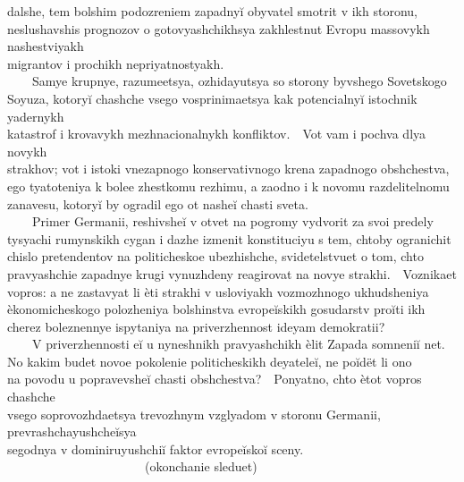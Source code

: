 {dal{\cprime}she, tem bol{\cprime}shim podozreniem zapadny{\u i} obyvatel{\cprime} smotrit v ikh storonu,\\
neslushavshis{\cprime} prognozov o gotovyashchikhsya zakhlestnut{\cprime} Evropu massovykh nashestviyakh\\
migrantov i prochikh nepriyatnostyakh.\\
{\ \ }{\ \ }Samye krupnye, razumeet{\cydot}sya, ozhidayut{\cydot}sya so storony byvshego Sovet{\cydot}skogo\\
Soyuza, kotory{\u i} chashche vsego vosprinimaet{\cydot}sya kak potencial{\cprime}ny{\u i} istochnik yadernykh\\
katastrof i krovavykh mezhnacional{\cprime}nykh konfliktov.{\ \ }Vot vam i pochva dlya novykh\\
strakhov; vot i istoki vnezapnogo konservativnogo krena zapadnogo obshchestva,\\
ego tyatoteniya k bolee zhestkomu rezhimu, a zaodno i k novomu razdelitel{\cprime}nomu\\
zanavesu, kotory{\u i} by ogradil ego ot nashe{\u i} chasti sveta.\\
{\ \ }{\ \ }Primer Germanii, reshivshe{\u i} v otvet na pogromy vydvorit{\cprime} za svoi predely\\
tysyachi rumynskikh cygan i dazhe izmenit{\cprime} konstituciyu s tem, chtoby ogranichit{\cprime}\\
chislo pretendentov na politicheskoe ubezhishche, svidetel{\cprime}stvuet o tom, chto\\
pravyashchie zapadnye krugi vynuzhdeny reagirovat{\cprime} na novye strakhi.{\ \ }Voznikaet\\
vopros: a ne zastavyat li \`eti strakhi v usloviyakh vozmozhnogo ukhudsheniya\\
\`ekonomicheskogo polozheniya bol{\cprime}shinstva evrope{\u i}skikh gosudarstv pro{\u i}ti ikh\\
cherez boleznennye ispytaniya na priverzhennost{\cprime} ideyam demokratii?\\
{\ \ }{\ \ }V priverzhennosti e{\u i} u nyneshnikh pravyashchikh \`elit Zapada somneni{\u i} net.\\
No kakim budet novoe pokolenie politicheskikh deyatele{\u i}, ne po{\u i}d\"et li ono\\
na povodu u popravevshe{\u i} chasti obshchestva?{\ \ }Ponyatno, chto \`etot vopros chashche\\
vsego soprovozhdaet{\cydot}sya trevozhnym vzglyadom v storonu Germanii, prevrashchayushche{\u i}sya\\
segodnya v dominiruyushchi{\u i} faktor evrope{\u i}sko{\u i} sceny.\\
{\ \ }{\ \ }{\ \ }{\ \ }{\ \ }{\ \ }{\ \ }{\ \ }{\ \ }{\ \ }{\ \ }(okonchanie sleduet)\\
 }

